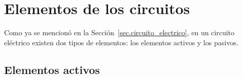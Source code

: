 	
	\section{Elementos de los circuitos}
	Como ya se mencionó en la Sección~\ref{sec.circuito_electrico}, en un circuito eléctrico existen dos tipos de elementos: los elementos activos y los pasivos.
	
	\subsection{Elementos activos}\label{sec.elementos_activos}
	
